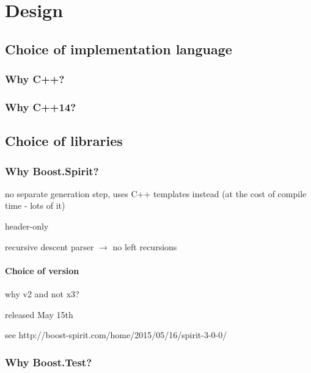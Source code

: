     

\chapter{Design} %
    \section{Choice of implementation language}
        \subsection{Why C++?}
        \subsection{Why C++14?}
    
    \section{Choice of libraries}
        \subsection{Why Boost.Spirit?}
            no separate generation step, uses C++ templates instead (at the cost of compile time - lots of it)
            
            header-only
            
            recursive descent parser $\rightarrow$ no left recursions
            \subsubsection{Choice of version}
                why v2 and not x3?
                
                released May 15th
                
                see http://boost-spirit.com/home/2015/05/16/spirit-3-0-0/
        \subsection{Why Boost.Test?}
    
